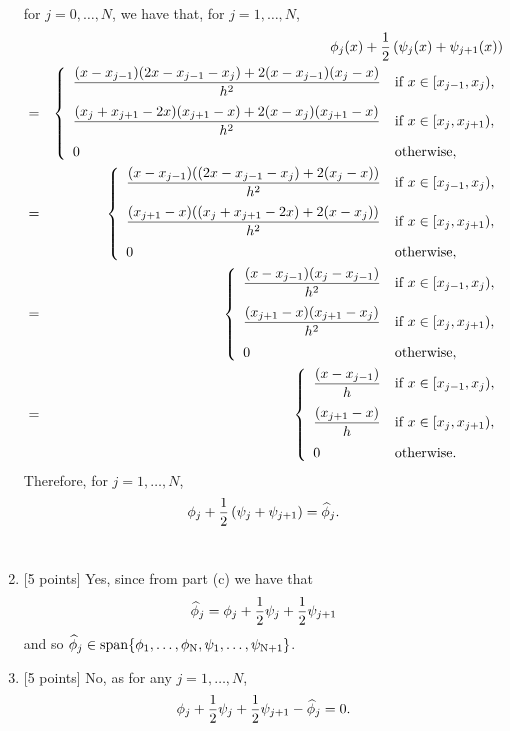 \begin{solution}
\begin{enumerate}
\[\]
for $j=0,\ldots,N$, we have that, for $j=1,\ldots,N$,
\begin{eqnarray*}
&&\phi_j(x)+{1 \over 2}\left(\psi_j(x)+\psi_{j+1}(x)\right)
\\
&=&\left\{\begin{array}{ll}
\displaystyle{{(x-x_{j-1})(2x-x_{j-1}-x_j)+2(x-x_{j-1})(x_j-x) \over h^2}} & \displaystyle{\mbox{if }x\in[x_{j-1},x_j)},
\\[10pt]
\displaystyle{{(x_j+x_{j+1}-2x)(x_{j+1}-x)+2(x-x_j)(x_{j+1}-x) \over h^2}} & \displaystyle{\mbox{if }x\in[x_j,x_{j+1})},
\\[10pt]
0 & \mbox{otherwise},
\end{array}\right.
\\
&=&\left\{\begin{array}{ll}
\displaystyle{{(x-x_{j-1})((2x-x_{j-1}-x_j)+2(x_j-x)) \over h^2}} & \displaystyle{\mbox{if }x\in[x_{j-1},x_j)},
\\[10pt]
\displaystyle{{(x_{j+1}-x)((x_j+x_{j+1}-2x)+2(x-x_j)) \over h^2}} & \displaystyle{\mbox{if }x\in[x_j,x_{j+1})},
\\[10pt]
0 & \mbox{otherwise},
\end{array}\right.
\\
&=&\left\{\begin{array}{ll}
\displaystyle{{(x-x_{j-1})(x_j-x_{j-1}) \over h^2}} & \displaystyle{\mbox{if }x\in[x_{j-1},x_j)},
\\[10pt]
\displaystyle{{(x_{j+1}-x)(x_{j+1}-x_j) \over h^2}} & \displaystyle{\mbox{if }x\in[x_j,x_{j+1})},
\\[10pt]
0 & \mbox{otherwise},
\end{array}\right.
\\
&=&\left\{\begin{array}{ll}
\displaystyle{{(x-x_{j-1}) \over h}} & \displaystyle{\mbox{if }x\in[x_{j-1},x_j)},
\\[10pt]
\displaystyle{{(x_{j+1}-x) \over h}} & \displaystyle{\mbox{if }x\in[x_j,x_{j+1})},
\\[10pt]
0 & \mbox{otherwise}.
\end{array}\right.
\end{eqnarray*}
Therefore, for $j=1,\ldots,N$,
\[
\phi_j+{1 \over 2}\left(\psi_j+\psi_{j+1}\right)=\widehat{\phi}_j.
\]
\\
\item {[5 points]} Yes, since from part (c) we have that
\[
\widehat{\phi}_j=\phi_j+{1 \over 2}\psi_j+{1 \over 2}\psi_{j+1}
\]
and so $\widehat{\phi}_j\in\rm{span}\{\phi_1,\ldots,\phi_N,\psi_1,\ldots,\psi_{N+1}\}$.
\\
\item {[5 points]} No, as for any $j=1,\ldots,N$,
\[
\phi_j+{1 \over 2}\psi_j+{1 \over 2}\psi_{j+1}-\widehat{\phi}_j=0.
\]
\end{enumerate}
\end{solution}


